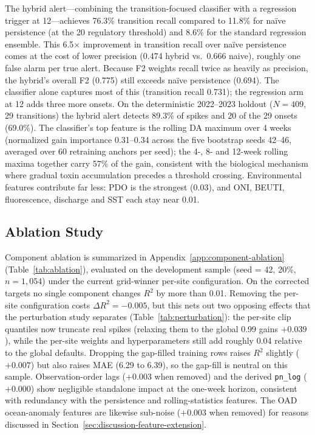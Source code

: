 \documentclass[toxins,article,submit,moreauthors]{Definitions/mdpi}
\begin{document}
The hybrid alert---combining the transition-focused classifier with a regression trigger at \SI{12}{\microgrampeg}---achieves 76.3\% transition recall compared to 11.8\% for na\"ive persistence (at the \SI{20}{\microgrampeg} regulatory threshold) and 8.6\% for the standard regression ensemble. This 6.5$\times$ improvement in transition recall over na\"ive persistence comes at the cost of lower precision (0.474 hybrid vs.\ 0.666 naive), roughly one false alarm per true alert. Because F2 weights recall twice as heavily as precision, the hybrid's overall F2 (0.775) still exceeds na\"ive persistence (0.694). The classifier alone captures most of this (transition recall 0.731); the regression arm at \SI{12}{\microgrampeg} adds three more onsets. On the deterministic 2022--2023 holdout ($N = 409$, 29 transitions) the hybrid alert detects 89.3\% of spikes and 20 of the 29 onsets (69.0\%). The classifier's top feature is the rolling DA maximum over 4 weeks (normalized gain importance 0.31--0.34 across the five bootstrap seeds 42--46, averaged over 60 retraining anchors per seed); the 4-, 8- and 12-week rolling maxima together carry 57\% of the gain, consistent with the biological mechanism where gradual toxin accumulation precedes a threshold crossing. Environmental features contribute far less: PDO is the strongest (0.03), and ONI, BEUTI, fluorescence, discharge and SST each stay near 0.01.

\subsection{Ablation Study}
\label{sec:results-ablation}

Component ablation is summarized in Appendix~\ref{app:component-ablation} (Table~\ref{tab:ablation}), evaluated on the development sample (seed = 42, 20\%, $n = 1{,}054$) under the current grid-winner per-site configuration. On the corrected targets no single component changes $R^2$ by more than 0.01. Removing the per-site configuration costs $\Delta R^2 = -0.005$, but this nets out two opposing effects that the perturbation study separates (Table~\ref{tab:perturbation}): the per-site clip quantiles now truncate real spikes (relaxing them to the global 0.99 gains $+0.039$), while the per-site weights and hyperparameters still add roughly 0.04 relative to the global defaults. Dropping the gap-filled training rows raises $R^2$ slightly ($+0.007$) but also raises MAE (6.29 to \SI{6.39}{\microgrampeg}), so the gap-fill is neutral on this sample. Observation-order lags ($+0.003$ when removed) and the derived \texttt{pn\_log} ($+0.000$) show negligible standalone impact at the one-week horizon, consistent with redundancy with the persistence and rolling-statistics features. The OAD ocean-anomaly features are likewise sub-noise ($+0.003$ when removed) for reasons discussed in Section~\ref{sec:discussion-feature-extension}.
\end{document}
